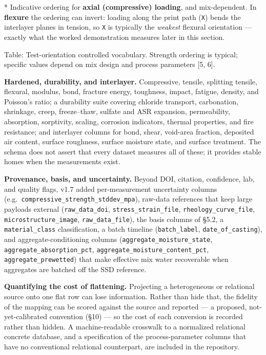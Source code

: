 \documentclass[
  11pt,
  letterpaper,
]{article}
\begin{document}
* Indicative ordering for \textbf{axial (compressive) loading}, and
mix-dependent. In \textbf{flexure} the ordering can invert: loading
along the print path (\texttt{X}) bends the interlayer planes in
tension, so \texttt{X} is typically the \emph{weakest} flexural
orientation --- exactly what the worked demonstration measures later in
this section.

Table: Test-orientation controlled vocabulary. Strength ordering is
typical; specific values depend on mix design and process parameters
{[}5, 6{]}.

\textbf{Hardened, durability, and interlayer.} Compressive, tensile,
splitting tensile, flexural, modulus, bond, fracture energy, toughness,
impact, fatigue, density, and Poisson's ratio; a durability suite
covering chloride transport, carbonation, shrinkage, creep,
freeze--thaw, sulfate and ASR expansion, permeability, absorption,
sorptivity, scaling, corrosion indicators, thermal properties, and fire
resistance; and interlayer columns for bond, shear, void-area fraction,
deposited air content, surface roughness, surface moisture state, and
surface treatment. The schema does not assert that every dataset
measures all of these; it provides stable homes when the measurements
exist.

\textbf{Provenance, basis, and uncertainty.} Beyond DOI, citation,
confidence, lab, and quality flags, v1.7 added per-measurement
uncertainty columns (e.g.~\texttt{compressive\_strength\_stddev\_mpa}),
raw-data references that keep large payloads external
(\texttt{raw\_data\_doi}, \texttt{stress\_strain\_file},
\texttt{rheology\_curve\_file}, \texttt{microstructure\_image},
\texttt{raw\_data\_file}), the basis columns of §5.2, a
\texttt{material\_class} classification, a batch timeline
(\texttt{batch\_label}, \texttt{date\_of\_casting}), and
aggregate-conditioning columns (\texttt{aggregate\_moisture\_state},
\texttt{aggregate\_absorption\_pct},
\texttt{aggregate\_moisture\_content\_pct},
\texttt{aggregate\_prewetted}) that make effective mix water recoverable
when aggregates are batched off the SSD reference.

\textbf{Quantifying the cost of flattening.} Projecting a heterogeneous
or relational source onto one flat row can lose information. Rather than
hide that, the fidelity of the mapping can be scored against the source
and reported --- a proposed, not-yet-calibrated convention (§10) --- so
the cost of each conversion is recorded rather than hidden. A
machine-readable crosswalk to a normalized relational concrete database,
and a specification of the process-parameter columns that have no
conventional relational counterpart, are included in the repository.
\end{document}
